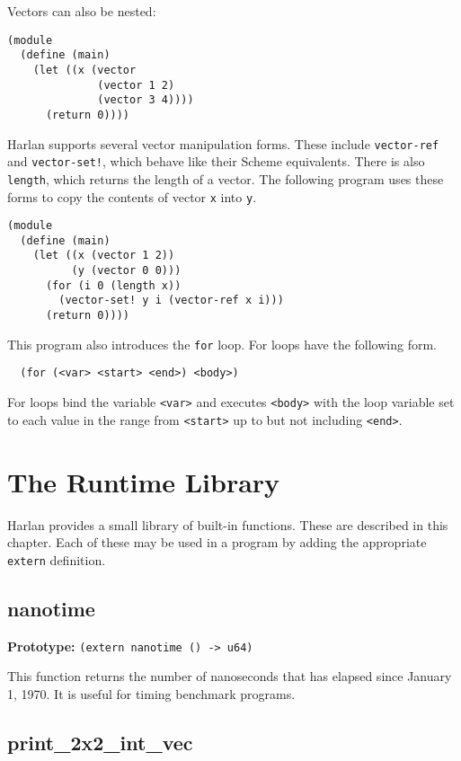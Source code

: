 \documentclass{book}
\begin{document}
Vectors can also be nested:

\begin{lstlisting}
(module
  (define (main)
    (let ((x (vector
              (vector 1 2)
              (vector 3 4))))
      (return 0))))
\end{lstlisting}

Harlan supports several vector manipulation forms. These include
\lstinline{vector-ref} and \lstinline{vector-set!}, which behave like
their Scheme equivalents. There is also \lstinline{length}, which
returns the length of a vector. The following program uses these forms
to copy the contents of vector \lstinline{x} into \lstinline{y}.

\begin{lstlisting}
(module
  (define (main)
    (let ((x (vector 1 2))
          (y (vector 0 0)))
      (for (i 0 (length x))
        (vector-set! y i (vector-ref x i)))
      (return 0))))
\end{lstlisting}

This program also introduces the \lstinline{for} loop. For loops have
the following form.

\begin{lstlisting}
  (for (<var> <start> <end>) <body>)
\end{lstlisting}

For loops bind the variable \lstinline{<var>} and executes
\lstinline{<body>} with the loop variable set to each value in the
range from \lstinline{<start>} up to but not including
\lstinline{<end>}.

\chapter{The Runtime Library}

Harlan provides a small library of built-in functions. These are
described in this chapter. Each of these may be used in a program by
adding the appropriate \lstinline{extern} definition.

\section{nanotime}

\textbf{Prototype:} \lstinline{(extern nanotime () -> u64)}

This function returns the number of nanoseconds that has elapsed since
January 1, 1970. It is useful for timing benchmark programs.

\section{print\_2x2\_int\_vec}
\end{document}
